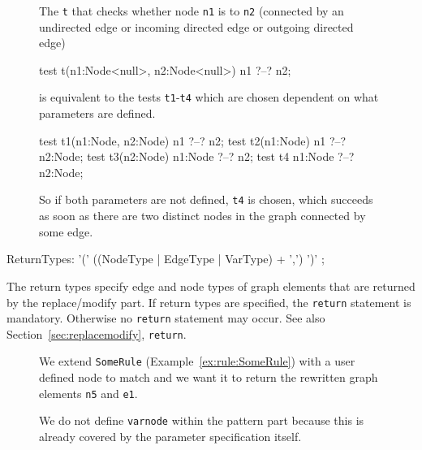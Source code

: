 \begin{figure}[htbp]
\begin{example}
The  \texttt{t} that checks whether node \texttt{n1} is  to \texttt{n2} (connected by an undirected edge or incoming directed edge or outgoing directed edge)
\begin{grgen}
test t(n1:Node<null>, n2:Node<null>) {
  n1 ?--? n2;
}
\end{grgen}
is equivalent to the tests \texttt{t1}-\texttt{t4} which are chosen dependent on what parameters are defined.
\begin{grgen}
test t1(n1:Node, n2:Node) {
  n1 ?--? n2;
}
test t2(n1:Node) {
  n1 ?--? n2:Node;
}
test t3(n2:Node) {
  n1:Node ?--? n2;
}
test t4 {
  n1:Node ?--? n2:Node;
}
\end{grgen}
So if both parameters are not defined, \texttt{t4} is chosen, which succeeds as soon as there are two distinct nodes in the graph connected by some edge.
\end{example}
\end{figure}

\begin{rail}
  ReturnTypes: '(' ((NodeType | EdgeType | VarType) + ',') ')' ;
\end{rail}
The return types specify edge and node types of graph elements that are returned by the replace/modify part.
If return types are specified, the \texttt{return} statement is mandatory.
Otherwise no \texttt{return} statement may occur. See also Section~\ref{sec:replacemodify}, \texttt{return}.

\begin{figure}[htbp]
\begin{example}\label{ex:rule:someruleext}
We extend \texttt{SomeRule} (Example~\ref{ex:rule:SomeRule}) with a user defined node to match and we want it to return the rewritten graph elements \texttt{n5} and \texttt{e1}.
\begin{grgen}
  rule SomeRuleExt(varnode:Node):(Node, EdgeTypeB) {
    n1:NodeTypeA;
    ...

    replace {
      varnode;
      ...
      return(n5, e1);
      eval {
        ...
\end{grgen}
We do not define \texttt{varnode} within the pattern part because this is already covered by the parameter specification itself.
\end{example}
\end{figure}


